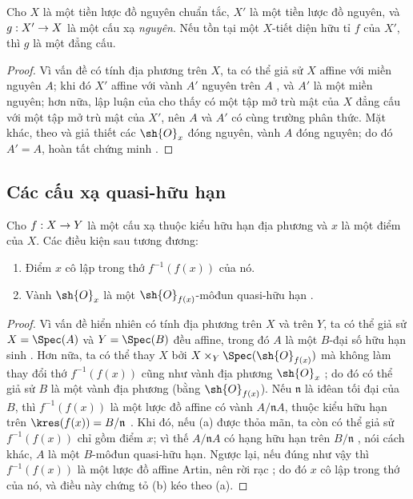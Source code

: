 \documentclass[oneside,10pt]{amsart}
\makeatletter
\newcommand{\ega@arrow}[2]{\mathchoice{#1}{#2}{#2}{#2}}
\renewcommand{\to}{\ega@arrow{\longrightarrow}{\rightarrow}}
\newcommand{\oldpage}[2][]{\marginnote{\normalfont\footnotesize\textbf{#1}~|~#2}\ignorespaces}
\let\EGAOriginalLabel\label
\renewcommand{\label}[1]{\phantomsection\EGAOriginalLabel{#1}}
\makeatother
\begin{document}
\begin{corollary}[6.1.15]
\label{II.6.1.15}
Cho $X$ là một tiền lược đồ nguyên chuẩn tắc, $X'$ là một tiền lược đồ nguyên, và $g:X'\to X$ là một cấu xạ \emph{nguyên}.
Nếu tồn tại một $X$-tiết diện hữu tỉ $f$ của $X'$, thì $g$ là một đẳng cấu.
\end{corollary}

\begin{proof}
Vì vấn đề có tính địa phương trên $X$, ta có thể giả sử $X$ affine với miền nguyên $A$; khi đó $X'$ affine với vành $A'$ nguyên trên $A$ , và $A'$ là một miền nguyên;
hơn nữa, lập luận của  cho thấy có một tập mở trù mật của $X$ đẳng cấu với một tập mở trù mật của $X'$, nên $A$ và $A'$ có cùng trường phân thức.
Mặt khác, theo  và giả thiết các $\sh{O}_x$ đóng nguyên, vành $A$ đóng nguyên;
do đó $A'=A$, hoàn tất chứng minh .
\end{proof}

\subsection{Các cấu xạ quasi-hữu hạn}
\label{subsection:II.6.2}

\begin{proposition}[6.2.1]
\label{II.6.2.1}
Cho $f:X\to Y$ là một cấu xạ thuộc kiểu hữu hạn địa phương và $x$ là một điểm của $X$.
Các điều kiện sau tương đương:
\oldpage[II]{115}
\begin{enumerate}
  \item[\rm{(a)}] Điểm $x$ cô lập trong thớ $f^{-1}(f(x))$ của nó.
  \item[\rm{(b)}] Vành $\sh{O}_x$ là một $\sh{O}_{f(x)}$-môđun quasi-hữu hạn .
\end{enumerate}
\end{proposition}

\begin{proof}
Vì vấn đề hiển nhiên có tính địa phương trên $X$ và trên $Y$, ta có thể giả sử $X=\Spec(A)$ và $Y=\Spec(B)$ đều affine, trong đó $A$ là một $B$-đại số hữu hạn sinh .
Hơn nữa, ta có thể thay $X$ bởi $X\times_Y\Spec(\sh{O}_{f(x)})$ mà không làm thay đổi thớ $f^{-1}(f(x))$ cũng như vành địa phương $\sh{O}_x$ ;
do đó có thể giả sử $B$ là một vành địa phương (bằng $\sh{O}_{f(x)}$).
Nếu $\mathfrak{n}$ là iđêan tối đại của $B$, thì $f^{-1}(f(x))$ là một lược đồ affine có vành $A/\mathfrak{n}A$, thuộc kiểu hữu hạn trên $\kres(f(x))=B/\mathfrak{n}$ .
Khi đó, nếu (a) được thỏa mãn, ta còn có thể giả sử $f^{-1}(f(x))$ chỉ gồm điểm $x$;
vì thế $A/\mathfrak{n}A$ có hạng hữu hạn trên $B/\mathfrak{n}$ , nói cách khác, $A$ là một $B$-môđun quasi-hữu hạn.
Ngược lại, nếu đúng như vậy thì $f^{-1}(f(x))$ là một lược đồ affine Artin, nên rời rạc ;
do đó $x$ cô lập trong thớ của nó, và điều này chứng tỏ (b) kéo theo (a).
\end{proof}
\end{document}
